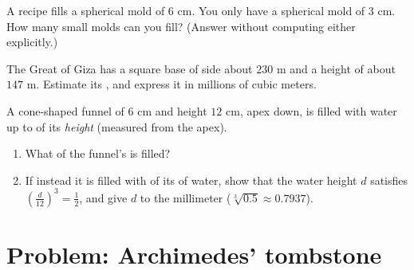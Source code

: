 \begin{exercise}[$\star\star$]\label{exo:g9:solids:7}
A recipe fills a spherical mold of  $6$ cm. You only have a
spherical mold of  $3$ cm. How many small molds can you fill?
(Answer without computing either  explicitly.)
\end{exercise}

\begin{exercise}[$\star\star$]\label{exo:g9:solids:8}
The Great  of Giza has a square base of side about $230$ m and a
height of about $147$ m. Estimate its , and express it in millions
of cubic meters.
\end{exercise}

\begin{exercise}[$\star\star\star$]\label{exo:g9:solids:9}
A cone-shaped funnel of  $6$ cm and height $12$ cm, apex down, is
filled with water up to  of its \emph{height} (measured from the
apex).
\begin{enumerate}
  \item What  of the funnel's  is filled?
  \item If instead it is filled with  of its \emph{} of water,
        show that the water height $d$ satisfies
        $\left(\frac{d}{12}\right)^3 = \frac12$, and give $d$ to the
        millimeter ($\sqrt[3]{0.5} \approx 0.7937$).
\end{enumerate}
\end{exercise}

\section{Problem: Archimedes' tombstone}

